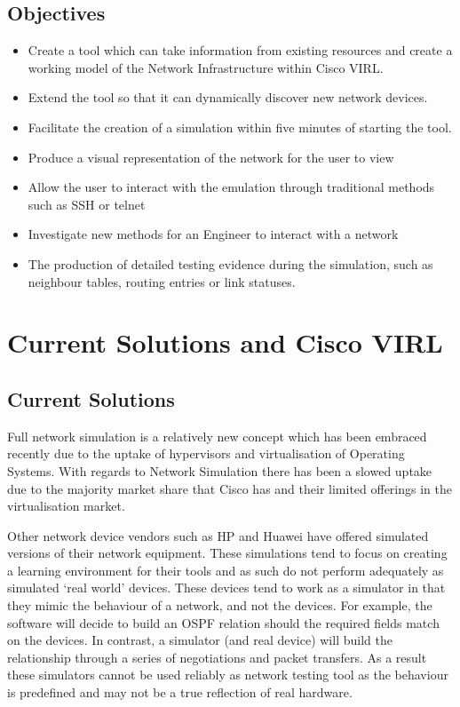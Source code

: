 \documentclass[11pt]{report}
\begin{document}
\section{Objectives}
\begin{itemize}
\item{Create a tool which can take information from existing resources and create a working model of the Network Infrastructure within Cisco VIRL.}
\item{Extend the tool so that it can dynamically discover new network devices.}
\item{Facilitate the creation of a simulation within five minutes of starting the tool.}
\item{Produce a visual representation of the network for the user to view}
\item{Allow the user to interact with the emulation through traditional methods such as SSH or telnet}
\item{Investigate new methods for an Engineer to interact with a network}
\item{The production of detailed testing evidence during the simulation, such as neighbour tables, routing entries or link statuses.}
\end{itemize}

\chapter{Current Solutions and Cisco VIRL}

\section{Current Solutions}

Full network simulation is a relatively new concept which has been embraced recently due to the uptake of hypervisors and virtualisation of Operating Systems. With regards to Network Simulation there has been a slowed uptake due to the majority market share that Cisco has and their limited offerings in the virtualisation market.

Other network device vendors such as HP and Huawei have offered simulated versions of their network equipment. These simulations tend to focus on creating a learning environment for their tools and as such do not perform adequately as simulated ‘real world’ devices. These devices tend to work as a simulator in that they mimic the behaviour of a network, and not the devices. For example, the software will decide to build an OSPF relation should the required fields match on the devices. In contrast, a simulator (and real device) will build the relationship through a series of negotiations and packet transfers. As a result these simulators cannot be used reliably as network testing tool as the behaviour is predefined and may not be a true reflection of real hardware.
\end{document}
